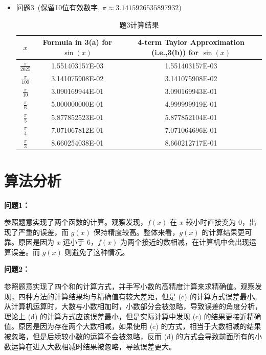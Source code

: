 \documentclass[UTF8]{ctexart}
\begin{document}
\begin{itemize}
 \item  问题3~(保留10位有效数字, $\pi \approx 3.14159 26535 897932$)
	\begin{table}[htb]
 \begin{center}
\begin{tabular}{|c|c|c|} %
\hline
 $x$  & Formula in 3(a) for $\sin(x)$ & 4-term Taylor Approximation (i.e.,3(b)) for $\sin(x)$  \\
\hline
	$\frac{\pi}{2025}$ & 1.551403157E-03 & 1.551403157E-03 \\
	\hline
	$\frac{\pi}{100}$ & 3.141075908E-02 & 3.141075908E-02 \\ \hline
	$\frac{\pi}{10}$ & 3.090169944E-01 & 3.090169943E-01 \\ \hline
	$\frac{\pi}{6}$  & 5.000000000E-01 & 4.999999919E-01 \\ \hline
	$\frac{\pi}{5}$  & 5.877852523E-01 & 5.877852104E-01 \\ \hline
	$\frac{\pi}{4}$  & 7.071067812E-01 & 7.071064696E-01 \\  \hline
	$\frac{\pi}{3}$  & 8.660254038E-01 & 8.660212717E-01 \\
\hline
\end{tabular}
\end{center}
\caption{题3计算结果}
\end{table}


\end{itemize}

\clearpage
\section{算法分析}

\textbf{问题1：}

参照题意实现了两个函数的计算。观察发现，$f(x)$ 在 $x$ 较小时直接变为 $0$，出现了严重的误差，而 $g(x)$ 保持精度较高。整体来看，$g(x)$ 的计算结果更可靠。原因是因为 $x$ 远小于 $6$，$f(x)$ 为两个接近的数相减，在计算机中会出现运算误差。而 $g(x)$ 则避免了这种情况。

\textbf{问题2：}

参照题意实现了四个和的计算方式，并手写小数的高精度计算来求精确值。观察发现，四种方法的计算结果均与精确值有较大差距，但是 (c) 的计算方式误差最小。从计算机运算时，大数与小数相加时，小数部分会被忽略，导致误差的角度分析，理论上 (d) 的计算方式应该误差最小，但是实际计算中发现 (c) 的结果更接近精确值。原因是因为存在两个大数相减，如果使用 (c) 的方式，相当于大数相减的结果被忽略，但是后续较小数的运算不会被忽略，反而 (d) 的方式会导致前面所有的小数运算在进入大数相减时结果被忽略，导致误差更大。
\end{document}
